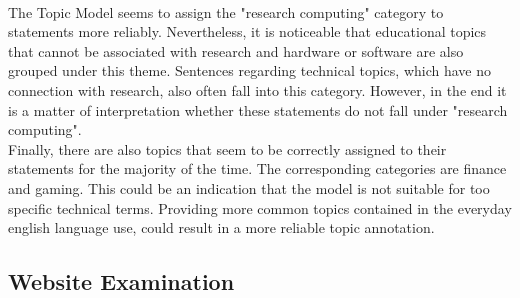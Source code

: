 \\
The Topic Model seems to assign the "research computing" category to statements more reliably.
Nevertheless, it is noticeable that educational topics that cannot be associated with research and hardware or software are also grouped under this theme.
Sentences regarding technical topics, which have no connection with research, also often fall into this category.
However, in the end it is a matter of interpretation whether these statements do not fall under "research computing".
\\
Finally, there are also topics that seem to be correctly assigned to their statements for the majority of the time.
The corresponding categories are finance and gaming.
This could be an indication that the model is not suitable for too specific technical terms.
Providing more common topics contained in the everyday english language use, could result in a more reliable topic annotation.
\subsection{Website Examination}

